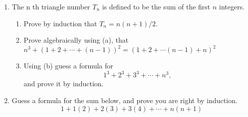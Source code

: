 \documentclass{article}
\begin{document}
\begin{enumerate}
\item
    The  n th triangle number  $T_{n}$ is defined to be the sum
    of the first  $n$ integers. \\
    \begin{enumerate}
    \item
    Prove by induction that  $T_{n} =  n( n + 1)/2.$ \\
    \item Prove algebraically using (a), that  $n^{3} + (1+2+\cdots +(n - 1))^{2}
        = (1+2+\cdots (n-1) +  n)^{2}$\\
    \item
    Using (b) guess a formula for
    \[
    1^{3} + 2^{3} + 3^{3} + \cdots  +  n^{3},
    \]
    and prove it by induction.
    \end{enumerate}

\item
    Guess a formula for the sum below, and prove you are right by
    induction.
    \[
    1 + 1(2) + 2(3) + 3(4) + \cdots  +  n(n + 1)
    \]

\end{enumerate}
\end{document}
